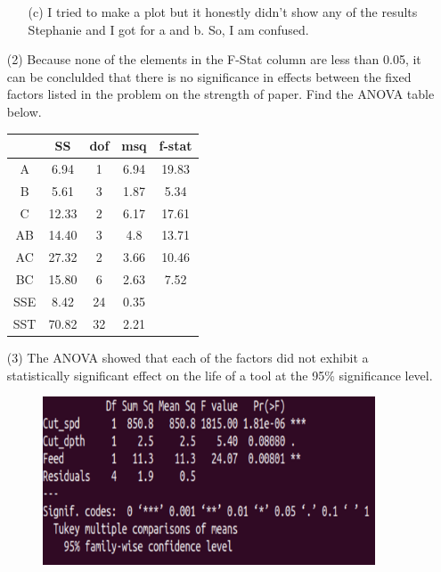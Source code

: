 \documentclass[12pt]{article}
\begin{document}
\begin{enumerate}
\begin{enumerate}
			\item[(c)] I tried to make a plot but it honestly didn't show any 
			of the results Stephanie and I got for a and b. So, I am confused.
		\end{enumerate}
	\item[(2)] Because none of the elements in the F-Stat column are less than 0.05, it can be conclulded that there 
	is no significance in effects between the fixed factors listed in the problem on the strength of paper. Find the ANOVA table below.\\
		\begin{center}
			\begin{tabular}{c|c|c|c|c}
				& SS & dof & msq & f-stat\\
				\hline
				A & 6.94 & 1 & 6.94 & 19.83\\
				B & 5.61 & 3 & 1.87 & 5.34\\
				C & 12.33 & 2 & 6.17 & 17.61\\
				AB & 14.40 & 3 & 4.8 & 13.71\\
				AC & 27.32 & 2 & 3.66 & 10.46\\
				BC & 15.80 & 6 & 2.63 & 7.52\\
				SSE & 8.42 & 24 & 0.35 & \\
				\hline
				SST & 70.82 & 32 & 2.21 & \\
			\end{tabular}
		\end{center}
\newpage
	\item[(3)] The ANOVA showed that each of the factors did not exhibit a statistically significant effect on the life of a tool at the 
		95\% significance level. 
		\begin{figure}[!h]
			\includegraphics[width=\linewidth, height = 5cm]{anova3.png}

\end{figure}
\end{enumerate}
\end{document}
